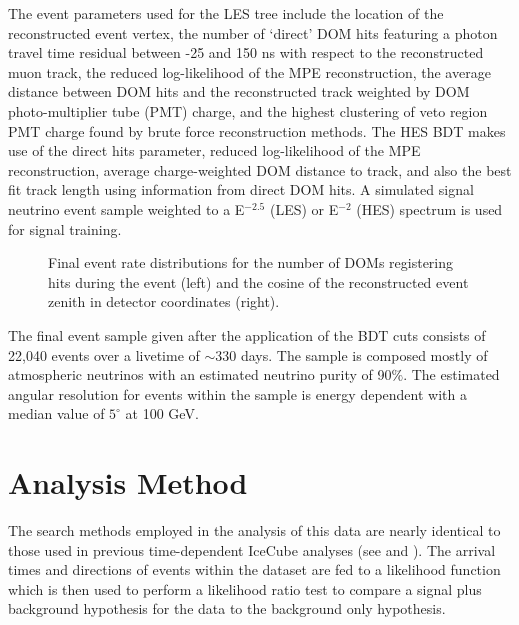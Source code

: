 \documentclass[manuscript]{aastex}
\begin{document}
The event parameters used for the LES tree include the location of the reconstructed event vertex, the number of `direct' DOM hits featuring a photon travel time residual between -25 and 150 ns with respect to the reconstructed muon track, the reduced log-likelihood of the MPE reconstruction, the average distance between DOM hits and the reconstructed track weighted by DOM photo-multiplier tube (PMT) charge, and the highest clustering of veto region PMT charge found by brute force reconstruction methods. The HES BDT makes use of the direct hits parameter, reduced log-likelihood of the MPE reconstruction, average charge-weighted DOM distance to track, and also the best fit track length using information from direct DOM hits. A simulated signal neutrino event sample weighted to a E$^{-2.5}$ (LES) or E$^{-2}$ (HES) spectrum is used for signal training.
\begin{figure}[ht]
\caption[Final Sample Event Parameter Distributions]{Final event rate distributions for the number of DOMs registering hits during the event (left) and the cosine of the reconstructed event zenith in detector coordinates (right).}
\label{fig:PostBDTDistributions}
\end{figure}

The final event sample given after the application of the BDT cuts consists of 22,040 events over a livetime of $\sim$330 days. The sample is composed mostly of atmospheric neutrinos with an estimated neutrino purity of 90$\%$. The estimated angular resolution for events within the sample is energy dependent with a median value of $5^{\circ}$ at 100 GeV.

\section{Analysis Method}
The search methods employed in the analysis of this data are nearly identical to those used in previous time-dependent IceCube analyses (see \cite{2008APh....29..299B} and \cite{2015arXiv150300598A}). The arrival times and directions of events within the dataset are fed to a likelihood function which is then used to perform a likelihood ratio test to compare a signal plus background hypothesis for the data to the background only hypothesis.
\end{document}
